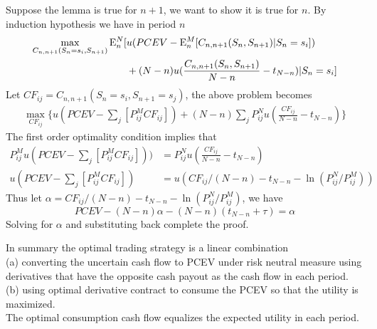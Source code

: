 Suppose the lemma is true for $n+1$, we want to show it is true for $n$. By induction hypothesis we have in period $n$
\begin{align*}
\max_{C_{n,n+1}(S_n=s_i,S_{n+1})} \mathrm{E}_{n}^N[ &u (PCEV - \mathrm{E}_{n}^M[C_{n,n+1}(S_{n},S_{n+1})|S_{n}=s_i]) \\& + (N-n) u(\frac{C_{n,n+1}(S_n,S_{n+1})}{N-n} - t_{N-n})|S_n=s_i]
\end{align*}
Let $CF_{ij} =C_{n,n+1}(S_n=s_i,S_{n+1}=s_j)$, the above problem becomes
\begin{align*}
\max_{CF_{ij}} \{u(PCEV-\sum_{j} [P_{ij}^M CF_{ij}]) + (N-n) \sum_{j} P_{ij}^Nu(\frac{CF_{ij}}{N-n}-t_{N-n}) \}
\end{align*}
The first order optimality condition implies that
\begin{align*}
P_{ij}^M u(PCEV-\sum_{j} [P_{ij}^M CF_{ij}] ) )&= P_{ij}^Nu(\frac{CF_{ij}}{N-n} -t_{N-n}) \\
u(PCEV-\sum_{j} [P_{ij}^M CF_{ij}]) &= u(CF_{ij}/(N-n) - t_{N-n}- \ln (P_{ij}^N/P_{ij}^M) )
\end{align*}
Thus let $\alpha = CF_{ij}/(N-n) -t_{N-n}-\ln (P_{ij}^N/P_{ij}^M)$, we have
\[ PCEV - (N-n) \alpha -(N-n)(t_{N-n} +\tau)  = \alpha\]
Solving for $\alpha$ and substituting back complete the proof.
\endproof

In summary the optimal trading strategy is a linear combination\\
(a) converting the uncertain cash flow to PCEV under risk neutral measure using derivatives that have the opposite cash payout as the cash flow in each period.\\
(b) using optimal derivative contract to consume the PCEV so that the utility is maximized.\\
The optimal consumption cash flow equalizes the expected utility in each period.






